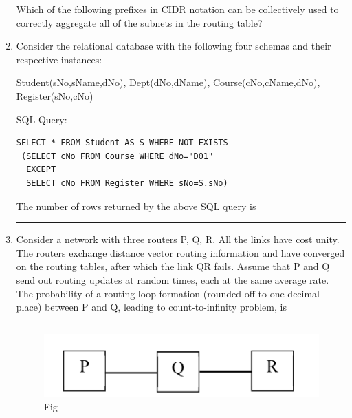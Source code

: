 \begin{enumerate}



Which of the following prefixes in CIDR notation can be collectively used to correctly aggregate all of the subnets in the routing table?  

\begin{enumerate}
\end{enumerate}

\hfill{}

\item Consider the relational database with the following four schemas and their respective instances:  

Student(sNo,sName,dNo), Dept(dNo,dName), Course(cNo,cName,dNo), Register(sNo,cNo)  

SQL Query:  

\begin{verbatim}
SELECT * FROM Student AS S WHERE NOT EXISTS
 (SELECT cNo FROM Course WHERE dNo="D01"
  EXCEPT
  SELECT cNo FROM Register WHERE sNo=S.sNo)
\end{verbatim}

The number of rows returned by the above SQL query is \rule{2cm}{0.4pt}  

\hfill{}

\item Consider a network with three routers P, Q, R. All the links have cost unity. The routers exchange distance vector routing information and have converged on the routing tables, after which the link QR fails. Assume that P and Q send out routing updates at random times, each at the same average rate. The probability of a routing loop formation (rounded off to one decimal place) between P and Q, leading to count-to-infinity problem, is \rule{2cm}{0.4pt}  
\begin{figure}[H]
\centering
\includegraphics[width=0.8\columnwidth]{figs/q57.png}
\caption{Fig}
\label{fig:q57}
\end{figure}
\hfill{}


\end{enumerate}
